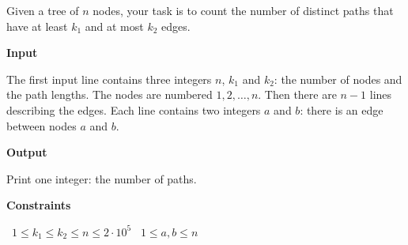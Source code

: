 Given a tree of $n$ nodes, your task is to count the number of distinct paths that have at least $k_1$ and at most $k_2$ edges.

\vspace{0.3cm}\noindent\textbf{Input}

The first input line contains three integers $n$, $k_1$ and $k_2$: the number of nodes and the path lengths. The nodes are numbered $1,2,\ldots,n$.
Then there are $n-1$ lines describing the edges. Each line contains two integers $a$ and $b$: there is an edge between nodes $a$ and $b$.

\vspace{0.3cm}\noindent\textbf{Output}

Print one integer: the number of paths.

\vspace{0.3cm}\noindent\textbf{Constraints}

\textbullet\ $1 \le k_1 \le k_2 \le n \le 2 \cdot 10^5$
\textbullet\ $1 \le a,b \le n$